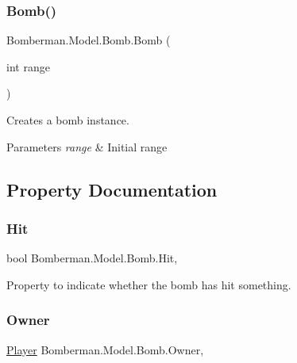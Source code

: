 \subsubsection{\texorpdfstring{Bomb()}{Bomb()}\hspace{0.1cm}{\footnotesize\ttfamily [2/2]}}
{\footnotesize\ttfamily Bomberman.\+Model.\+Bomb.\+Bomb (\begin{DoxyParamCaption}\item[{int}]{range }\end{DoxyParamCaption})\hspace{0.3cm}{\ttfamily [inline]}}



Creates a bomb instance. 


\begin{DoxyParams}{Parameters}
{\em range} & Initial range\\
\hline
\end{DoxyParams}


\subsection{Property Documentation}
\mbox{\label{class_bomberman_1_1_model_1_1_bomb_aeaf547a4bffd2f4a393a5cd670145b88}} 
\subsubsection{\texorpdfstring{Hit}{Hit}}
{\footnotesize\ttfamily bool Bomberman.\+Model.\+Bomb.\+Hit\hspace{0.3cm}{\ttfamily [get]}, {\ttfamily [set]}}



Property to indicate whether the bomb has hit something. 

\mbox{\label{class_bomberman_1_1_model_1_1_bomb_a910b1defa28ef1de0a2794f90a00ba38}} 
\subsubsection{\texorpdfstring{Owner}{Owner}}
{\footnotesize\ttfamily \mbox{\hyperlink{class_bomberman_1_1_model_1_1_player}{Player}} Bomberman.\+Model.\+Bomb.\+Owner\hspace{0.3cm}{\ttfamily [get]}, {\ttfamily [set]}}




